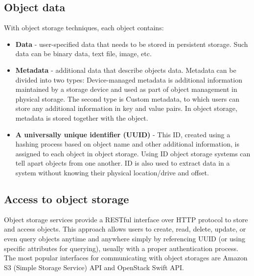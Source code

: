     \subsection{Object data}
    With object storage techniques, each object contains\cite{ibmObjectStorage}:
    \begin{itemize}
      \item \textbf{Data} - user-specified data that needs to be stored in persistent storage. Such data can be binary data, text file, image, etc.
      \item \textbf{Metadata} - additional data that describe objects data. Metadata can be divided into two types: Device-managed metadata is additional information maintained by a storage device and used as part of object management in physical storage\cite{objectBasedStorage}. The second type is Custom metadata, to which users can store any additional information in key and value pairs. In object storage, metadata is stored together with the object.
      \item \textbf{A universally unique identifier (UUID)} - This ID, created using a hashing process based on object name and other additional information, is assigned to each object in object storage. Using ID object storage systems can tell apart objects from one another. ID is also used to extract data in a system without knowing their physical location/drive and offset.
    \end{itemize}

    \subsection{Access to object storage}
    Object storage services provide a RESTful interface \cite{cloudObjectStorage} over HTTP protocol to store and access objects. This approach allows users to create, read, delete, update, or even query objects anytime and anywhere simply by referencing UUID (or using specific attributes for querying), usually with a proper authentication process. The most popular interfaces for communicating with object storages are Amazon S3 (Simple Storage Service) API and OpenStack Swift API.

